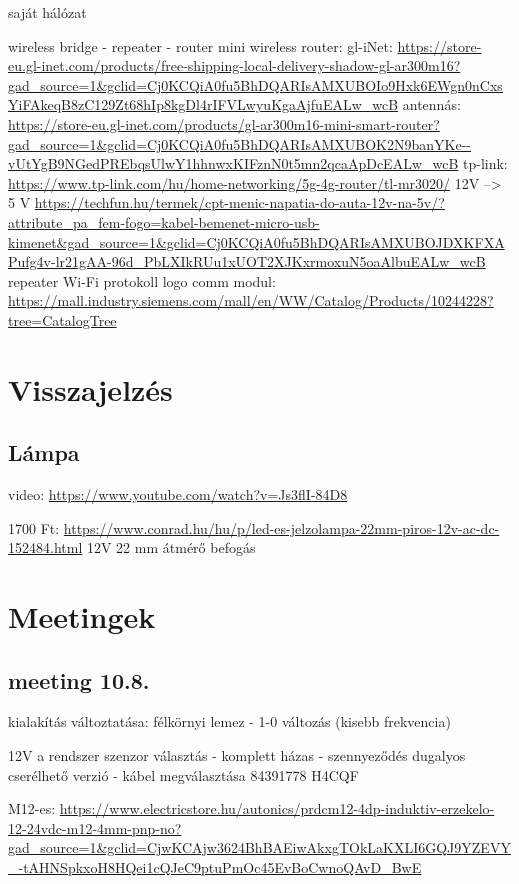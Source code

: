 \documentclass{article}
\begin{document}
	saját hálózat
	
	wireless bridge - repeater - router
	mini wireless router:
	gl-iNet:
	\url{https://store-eu.gl-inet.com/products/free-shipping-local-delivery-shadow-gl-ar300m16?gad_source=1&gclid=Cj0KCQiA0fu5BhDQARIsAMXUBOIo9Hxk6EWgn0nCxsYiFAkeqB8zC129Zt68hIp8kgDl4rIFVLwyuKgaAjfuEALw_wcB}
	antennás:
	\url{https://store-eu.gl-inet.com/products/gl-ar300m16-mini-smart-router?gad_source=1&gclid=Cj0KCQiA0fu5BhDQARIsAMXUBOK2N9banYKe--vUtYgB9NGedPREbqsUlwY1hhnwxKIFznN0t5mn2qcaApDcEALw_wcB}
	tp-link:
	\url{https://www.tp-link.com/hu/home-networking/5g-4g-router/tl-mr3020/}
	12V --> 5 V
	\url{https://techfun.hu/termek/cpt-menic-napatia-do-auta-12v-na-5v/?attribute_pa_fem-fogo=kabel-bemenet-micro-usb-kimenet&gad_source=1&gclid=Cj0KCQiA0fu5BhDQARIsAMXUBOJDXKFXAPufg4v-lr21gAA-96d_PbLXIkRUu1xUOT2XJKxrmoxuN5oaAlbuEALw_wcB}
	repeater
	Wi-Fi protokoll 
	logo comm modul:
	\url{https://mall.industry.siemens.com/mall/en/WW/Catalog/Products/10244228?tree=CatalogTree}
	
	\section{Visszajelzés}
	
	\subsection{Lámpa}
	
	video: \url{https://www.youtube.com/watch?v=Js3flI-84D8}

	1700 Ft: \url{https://www.conrad.hu/hu/p/led-es-jelzolampa-22mm-piros-12v-ac-dc-152484.html}
	12V
	22 mm átmérő befogás
	
	
	\section{Meetingek}
	
	\subsection{meeting 10.8.}
	
	kialakítás változtatása: félkörnyi lemez - 1-0 változás (kisebb frekvencia)
	
	12V a rendszer
	szenzor választás - komplett házas - szennyeződés
	dugalyos cserélhető verzió - kábel megválasztása
	84391778 H4CQF
	
	M12-es: \url{https://www.electricstore.hu/autonics/prdcm12-4dp-induktiv-erzekelo-12-24vdc-m12-4mm-pnp-no?gad_source=1&gclid=CjwKCAjw3624BhBAEiwAkxgTOkLaKXLI6GQJ9YZEVY_-tAHNSpkxoH8HQei1cQJeC9ptuPmOc45EvBoCwnoQAvD_BwE}
	
\end{document}
